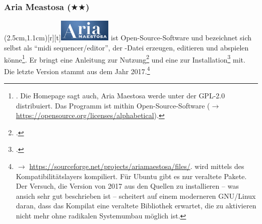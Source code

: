 %
%
%



\subsubsection{Aria Meastosa ($\bigstar$$\bigstar$)}

\parpic(2.5cm,1.1cm)[r][t]{\includegraphics[width=2.5cm]{logos/ariamaestoso-300dpi.png}}
\label{AriaMaestosa} ist Open-Source-Software und bezeichnet
sich selbst als  \enquote{midi sequencer/editor}, der -Datei erzeugen,
editieren und abspielen könne\footnote{\cite[vgl.][\nopage
wp]{AriaMaestosa2017a}. Die Homepage sagt auch, Aria Maestosa werde unter der
GPL-2.0 distribuiert. Das Programm ist mithin Open-Source-Software ($\rightarrow$
\href{https://opensource.org/licenses/alphabetical}
{https://opensource.org/licenses/alphabetical}).}. Er bringt eine Anleitung zur
Nutzung\footcite[vgl.][\nopage wp]{AriaMaestosa2017b} und eine zur
Installation\footcite[vgl.][\nopage wp]{AriaMaestosa2017c} mit. Die letzte
Version stammt aus dem Jahr 2017.\footnote{$\rightarrow$
\href{https://sourceforge.net/projects/ariamaestosa/files/}
{https://sourceforge.net/projects/ariamaestosa/files/}.  wird
mittels des Kompatibilitätslayers  kompiliert. Für Ubuntu gibt es
nur veraltete Pakete. Der Versuch, die Version von 2017 aus den Quellen zu
installieren -- was ansich sehr gut beschrieben ist -- scheitert auf einem
mo\-der\-ne\-ren GNU/Linux daran, dass das Kompilat eine veraltete Bibliothek
erwartet, die zu aktivieren nicht mehr ohne radikalen Systemumbau möglich ist.}

